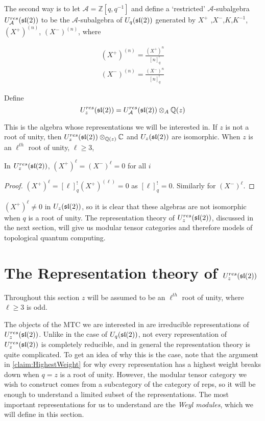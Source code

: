 The second way is to let $\mathcal{A} = \mathbb{Z}[q,q^{-1}]$ and define a
`restricted' $\mathcal{A}$-subalgebra $U_\mathcal{A}^{res}(\mathfrak{sl}(2))$ to be the
$\mathcal{A}$-subalgebra of $U_q(\mathfrak{sl}(2))$ generated by $ X^+$
,$X^-$,$K$,$K^{-1}$, $(X^+) ^{(n)}$, $(X^-)^{(n)}$, where


\begin{align}
     (X^+)^{(n)} = \frac{ (X^+)^n}{[n]^!_{q}} \\
    (X^-)^{(n)} = \frac{(X^-)^n}{[n]^!_{q}} 
\end{align}


Define 
\begin{equation}
    U_z^{res}(\mathfrak{sl}(2)) = U_\mathcal{A}^{res}(\mathfrak{sl}(2)) \otimes_A \mathbb{Q}(z)
\end{equation}

This is the algebra whose representations we will be interested in.  If $z$ is
not a root of unity, then $U_z^{res}(\mathfrak{sl}(2)) \otimes_{\mathbb{Q}(z)}
\mathbb{C}$ and $U_z(\mathfrak{sl}(2))$ are isomorphic. When $z$ is an $\ell^{th}$ root
of unity, $\ell \geq 3$,

\begin{lemma}
    In $U_z^{res}(\mathfrak{sl}(2))$, $ (X^+)^\ell = (X^-)^\ell = 0$ for all $i$
\end{lemma}
\begin{proof}
    $ (X^+)^\ell = [\ell]_{q}^!  (X^+)^{(\ell)} = 0$ as $[\ell]_{q}^! = 0$. Similarly for $(X^-)^\ell$.
\end{proof}

$(X^+)^\ell \neq 0$ in $U_z(\mathfrak{sl}(2))$, so it is clear that these algebras are
not isomorphic when $q$ is a root of unity. The representation theory of
$U_z^{res}(\mathfrak{sl}(2))$, discussed in the next section, will give us modular
tensor categories and therefore models of topological quantum computing.

\section{The Representation theory of $U_z^{res}(\mathfrak{sl}(2))$}
\label{section:RepTheoryofResSL2}


Throughout this section $z$ will be assumed to be an $\ell^{th}$ root of unity, where $\ell \geq 3$ is odd.

The objects of the MTC we are interested in are irreducible representations of
$U_z^{res}(\mathfrak{sl}(2))$. Unlike in the case of $U_q(\mathfrak{sl}(2))$, not every
representation of $U_z^{res}(\mathfrak{sl}(2))$ is completely reducible, and in general
the representation theory is quite complicated. To get an idea of why this is
the case, note that the argument in \ref{claim:HighestWeight} for why every
representation has a highest weight breaks down when $q=z$ is a root of unity.
However, the modular tensor category we wish to construct comes from a
subcategory of the category of reps, so it will be enough to understand a
limited subset of the representations. The most important representations for
us to understand are the \emph{Weyl modules}, which we will define in this
section. 


